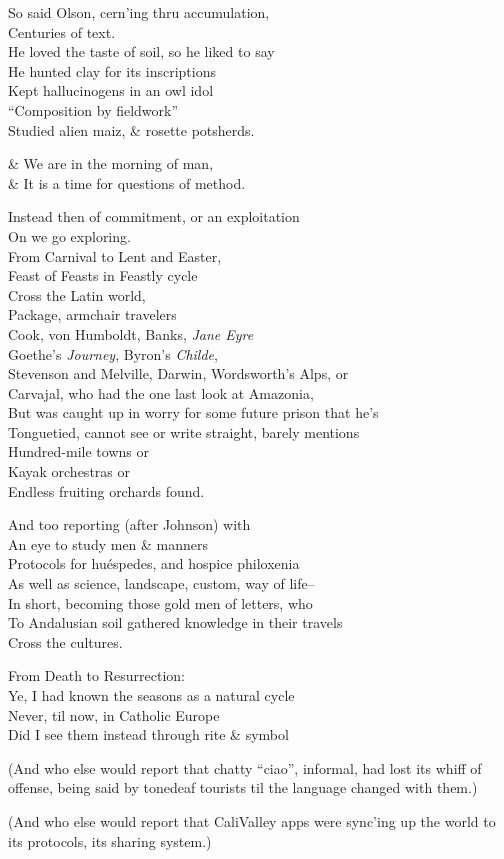 So said Olson, cern'ing thru accumulation, \\
Centuries of text. \\
He loved the taste of soil, so he liked to say \\
He hunted clay for its inscriptions \\
Kept hallucinogens in an owl idol \\
``Composition by fieldwork'' \\
Studied alien maiz, \& rosette potsherds.

\& We are in the morning of man, \\
\& It is a time for questions of method.

Instead then of commitment, or an exploitation \\
On we go exploring. \\
From Carnival to Lent and Easter, \\
Feast of Feasts in Feastly cycle \\
Cross the Latin world, \\
Package, armchair travelers \\
Cook, von Humboldt, Banks, \textit{Jane Eyre} \\
Goethe's \textit{Journey}, Byron's \textit{Childe}, \\
Stevenson and Melville, Darwin, Wordsworth's Alps, or \\
Carvajal, who had the one last look at Amazonia, \\
But was caught up in worry for some future prison that he's \\
Tonguetied, cannot see or write straight, barely mentions \\
Hundred-mile towns or \\
Kayak orchestras or \\
Endless fruiting orchards found.

And too reporting (after Johnson) with  \\
An eye to study men \& manners \\
Protocols for huéspedes, and hospice philoxenia \\
As well as science, landscape, custom, way of life-- \\
In short, becoming those gold men of letters, who \\
To Andalusian soil gathered knowledge in their travels \\
Cross the cultures.

From Death to Resurrection: \\
Ye, I had known the seasons as a natural cycle \\
Never, til now, in Catholic Europe \\
Did I see them instead through rite \& symbol

(And who else would report that chatty ``ciao'', informal, had lost its whiff of offense, being said by tonedeaf tourists til the language changed with them.)

(And who else would report that CaliValley apps were sync'ing up the world to its protocols, its sharing system.)